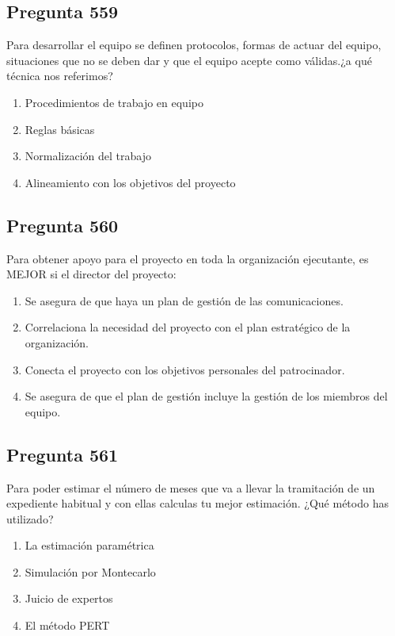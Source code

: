 \documentclass[11pt,a4paper]{article}
\begin{document}
\subsection*{Pregunta 559}
Para desarrollar el equipo se definen protocolos, formas de actuar del equipo, situaciones que no se deben dar y que el equipo acepte como válidas.¿a qué técnica nos referimos?

\begin{enumerate}[label=\alph*)]
  \item Procedimientos de trabajo en equipo
  \item Reglas básicas
  \item Normalización del trabajo
  \item Alineamiento con los objetivos del proyecto
\end{enumerate}

\subsection*{Pregunta 560}
Para obtener apoyo para el proyecto en toda la organización ejecutante, es MEJOR si el director del proyecto:

\begin{enumerate}[label=\alph*)]
  \item Se asegura de que haya un plan de gestión de las comunicaciones.
  \item Correlaciona la necesidad del proyecto con el plan estratégico de la organización.
  \item Conecta el proyecto con los objetivos personales del patrocinador.
  \item Se asegura de que el plan de gestión incluye la gestión de los miembros del equipo.
\end{enumerate}

\subsection*{Pregunta 561}
Para poder estimar el número de meses que va a llevar la tramitación de un expediente habitual y con ellas calculas tu mejor estimación. ¿Qué método has utilizado?

\begin{enumerate}[label=\alph*)]
  \item La estimación paramétrica
  \item Simulación por Montecarlo
  \item Juicio de expertos
  \item El método PERT
\end{enumerate}
\end{document}
